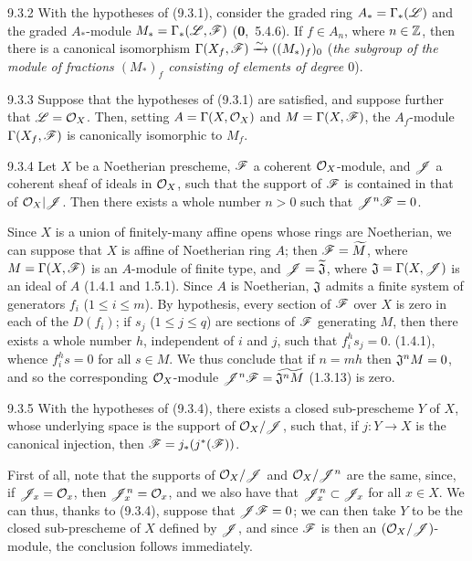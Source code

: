 \documentclass[../main.tex]{subfiles}
\begin{document}
\begin{cx}[Corollary]{9.3.2}
    With the hypotheses of {\normalfont(9.3.1)}, consider the graded ring $A_*=\Gamma_*(\mathscr{L})$ and the graded $A_*$-module $M_*=\Gamma_*(\mathscr{L},\mathscr{F})$ {\normalfont(\textbf{0},~5.4.6)}.
    If $f\in A_n$, where $n\in\mathbb{Z}$, then there is a canonical isomorphism $\Gamma(X_f,\mathscr{F})\xrightarrow{\sim}((M_*)_f)_0$ (\emph{the subgroup of the module of fractions $(M_*)_f$ consisting of elements of degree $0$}).
\end{cx}
\begin{cx}[Corollary]{9.3.3}
    Suppose that the hypotheses of {\normalfont(9.3.1)} are satisfied, and suppose further that $\mathscr{L}=\mathcal{O}_X$.
    Then, setting $A=\Gamma(X,\mathcal{O}_X)$ and $M=\Gamma(X,\mathscr{F})$, the $A_f$-module $\Gamma(X_f,\mathscr{F})$ is canonically isomorphic to $M_f$.
\end{cx}
\begin{cx}[Proposition]{9.3.4}
    Let $X$ be a Noetherian prescheme, $\mathscr{F}$ a coherent $\mathcal{O}_X$-module, and $\mathscr{J}$ a coherent sheaf of ideals in $\mathcal{O}_X$, such that the support of $\mathscr{F}$ is contained in that of $\mathcal{O}_X|\mathscr{J}$.
    Then there exists a whole number $n>0$ such that $\mathscr{J}^n\mathscr{F}=0$.
\end{cx}

Since $X$ is a union of finitely-many affine opens whose rings are Noetherian, we can suppose that $X$ is affine of Noetherian ring $A$; then $\mathscr{F}=\widetilde{M}$, where $M=\Gamma(X,\mathscr{F})$ is an $A$-module of finite type, and $\mathscr{J}=\widetilde{\mathfrak{J}}$, where $\mathfrak{J}=\Gamma(X,\mathscr{J})$ is an ideal of $A$ (1.4.1 and 1.5.1).
Since $A$ is Noetherian, $\mathfrak{J}$ admits a finite system of generators $f_i$ ($1\leqslant i\leqslant m$).
By hypothesis, every section of $\mathscr{F}$ over $X$ is zero in each of the $D(f_i)$; if $s_j$ ($1\leqslant j\leqslant q$) are sections of $\mathscr{F}$ generating $M$, then there exists a whole number $h$, independent of $i$ and $j$, such that $f_i^h s_j=0$. (1.4.1), whence $f_i^h s=0$ for all $s\in M$.
We thus conclude that if $n=mh$ then $\mathfrak{J}^n M=0$, and so the corresponding $\mathcal{O}_X$-module $\mathscr{J}^n\mathscr{F}=\widetilde{\mathfrak{J}^nM}$ (1.3.13) is zero.

\begin{cx}[Corollary]{9.3.5}
    With the hypotheses of {\normalfont(9.3.4)}, there exists a closed sub-prescheme $Y$ of $X$, whose underlying space is the support of $\mathcal{O}_X/\mathscr{J}$, such that, if $j\colon Y\to X$ is the canonical injection, then $\mathscr{F}=j_*(j^*(\mathscr{F}))$.
\end{cx}

First of all, note that the supports of $\mathcal{O}_X/\mathscr{J}$ and $\mathcal{O}_X/\mathscr{J}^n$ are the same, since, if $\mathscr{J}_x=\mathcal{O}_x$, then $\mathscr{J}_x^n=\mathcal{O}_x$, and we also have that $\mathscr{J}_x^n\subset\mathscr{J}_x$ for all $x\in X$.
We can thus, thanks to (9.3.4), suppose that $\mathscr{J}\mathscr{F}=0$; we can then take $Y$ to be the closed sub-prescheme of $X$ defined by $\mathscr{J}$, and since $\mathscr{F}$ is then an $(\mathcal{O}_X/\mathscr{J})$-module, the conclusion follows immediately.
\end{document}
